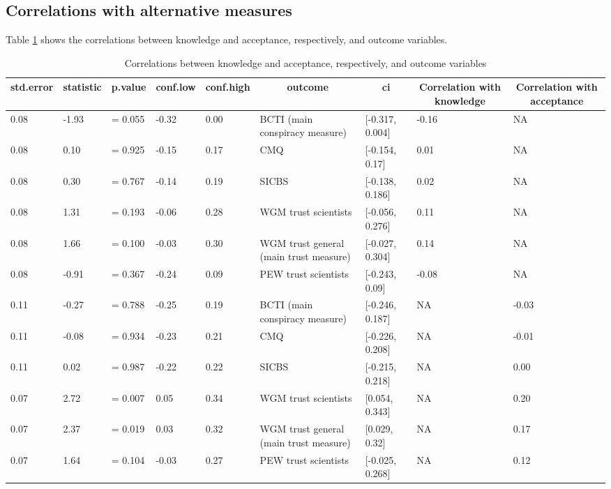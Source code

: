 \documentclass[
  doc,floatsintext]{apa6}
\begin{document}
\subsection{Correlations with alternative measures}\label{correlations-with-alternative-measures-2}

Table \ref{tab:exp3-correlations-outcomes} shows the correlations between knowledge and acceptance, respectively, and outcome variables.

\begin{table}[tbp]

\begin{center}
\begin{threeparttable}

\caption{\label{tab:exp3-correlations-outcomes}Correlations between knowledge and acceptance, respectively, and outcome variables}

\begin{tabular}{lllllllll}
\toprule
std.error & \multicolumn{1}{c}{statistic} & \multicolumn{1}{c}{p.value} & \multicolumn{1}{c}{conf.low} & \multicolumn{1}{c}{conf.high} & \multicolumn{1}{c}{outcome} & \multicolumn{1}{c}{ci} & \multicolumn{1}{c}{Correlation with knowledge} & \multicolumn{1}{c}{Correlation with acceptance}\\
\midrule
0.08 & -1.93 & = 0.055 & -0.32 & 0.00 & BCTI 
(main conspiracy measure) & {}[-0.317, 0.004] & -0.16 & NA\\
0.08 & 0.10 & = 0.925 & -0.15 & 0.17 & CMQ & {}[-0.154, 0.17] & 0.01 & NA\\
0.08 & 0.30 & = 0.767 & -0.14 & 0.19 & SICBS & {}[-0.138, 0.186] & 0.02 & NA\\
0.08 & 1.31 & = 0.193 & -0.06 & 0.28 & WGM trust scientists & {}[-0.056, 0.276] & 0.11 & NA\\
0.08 & 1.66 & = 0.100 & -0.03 & 0.30 & WGM trust general 
(main trust measure) & {}[-0.027, 0.304] & 0.14 & NA\\
0.08 & -0.91 & = 0.367 & -0.24 & 0.09 & PEW trust scientists & {}[-0.243, 0.09] & -0.08 & NA\\
0.11 & -0.27 & = 0.788 & -0.25 & 0.19 & BCTI 
(main conspiracy measure) & {}[-0.246, 0.187] & NA & -0.03\\
0.11 & -0.08 & = 0.934 & -0.23 & 0.21 & CMQ & {}[-0.226, 0.208] & NA & -0.01\\
0.11 & 0.02 & = 0.987 & -0.22 & 0.22 & SICBS & {}[-0.215, 0.218] & NA & 0.00\\
0.07 & 2.72 & = 0.007 & 0.05 & 0.34 & WGM trust scientists & {}[0.054, 0.343] & NA & 0.20\\
0.07 & 2.37 & = 0.019 & 0.03 & 0.32 & WGM trust general 
(main trust measure) & {}[0.029, 0.32] & NA & 0.17\\
0.07 & 1.64 & = 0.104 & -0.03 & 0.27 & PEW trust scientists & {}[-0.025, 0.268] & NA & 0.12\\
\bottomrule
\end{tabular}

\end{threeparttable}
\end{center}

\end{table}
\end{document}
